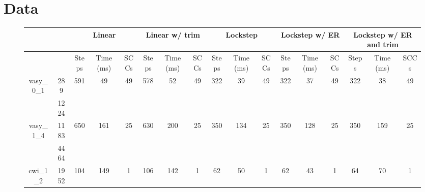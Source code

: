 \documentclass[../master/master.tex]{subfiles}
\begin{document}
\section{Data}
\begin{figure}
\begin{adjustbox}{angle=90}
\centering
\begin{tabular}{ |c|c||c|c|c||c|c|c||c|c|c||c|c|c||c|c|c|| } 
\hline
 \multicolumn{2}{|c||}{} & \multicolumn{3}{c||}{Linear} & \multicolumn{3}{c||}{Linear w/ trim} & \multicolumn{3}{c||}{Lockstep} & \multicolumn{3}{c||}{Lockstep w/ ER} & \multicolumn{3}{c||}{Lockstep w/ ER and trim}\\
\hline
\multicolumn{2}{|c||}{}& Steps & Time (ms) & SCCs& Steps & Time (ms) & SCCs& Steps & Time (ms) & SCCs& Steps & Time (ms) & SCCs& Steps & Time (ms) & SCCs\\
\hline
\multirow{2}{3.4em}{vasy\_0\_1} & 289 & \multirow{2}{3.4em}{591} & \multirow{2}{3.4em}{49} & \multirow{2}{3.4em}{49} & \multirow{2}{3.4em}{578} & \multirow{2}{3.4em}{52} & \multirow{2}{3.4em}{49} & \multirow{2}{3.4em}{322} & \multirow{2}{3.4em}{39} & \multirow{2}{3.4em}{49} & \multirow{2}{3.4em}{322} & \multirow{2}{3.4em}{37} & \multirow{2}{3.4em}{49} & \multirow{2}{3.4em}{322} & \multirow{2}{3.4em}{38} & \multirow{2}{3.4em}{49} \\
\cline{2-2}
 & 1224  &  &  &  &  &  &  &  &  &  &  &  &  &  &  &  \\
\hline
\multirow{2}{3.4em}{vasy\_1\_4} & 1183 & \multirow{2}{3.4em}{650} & \multirow{2}{3.4em}{161} & \multirow{2}{3.4em}{25} & \multirow{2}{3.4em}{630} & \multirow{2}{3.4em}{200} & \multirow{2}{3.4em}{25} & \multirow{2}{3.4em}{350} & \multirow{2}{3.4em}{134} & \multirow{2}{3.4em}{25} & \multirow{2}{3.4em}{350} & \multirow{2}{3.4em}{128} & \multirow{2}{3.4em}{25} & \multirow{2}{3.4em}{350} & \multirow{2}{3.4em}{159} & \multirow{2}{3.4em}{25} \\
\cline{2-2}
 & 4464  &  &  &  &  &  &  &  &  &  &  &  &  &  &  &  \\
\hline
\multirow{2}{3.4em}{cwi\_1\_2} & 1952 & \multirow{2}{3.4em}{104} & \multirow{2}{3.4em}{149} & \multirow{2}{3.4em}{1} & \multirow{2}{3.4em}{106} & \multirow{2}{3.4em}{142} & \multirow{2}{3.4em}{1} & \multirow{2}{3.4em}{62} & \multirow{2}{3.4em}{50} & \multirow{2}{3.4em}{1} & \multirow{2}{3.4em}{62} & \multirow{2}{3.4em}{43} & \multirow{2}{3.4em}{1} & \multirow{2}{3.4em}{64} & \multirow{2}{3.4em}{70} & \multirow{2}{3.4em}{1} \\

\end{tabular}
\end{adjustbox}
\end{figure}
\end{document}
